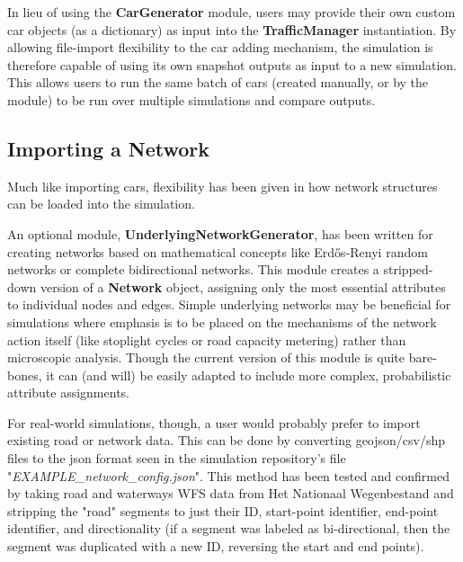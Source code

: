 \par In lieu of using the \textbf{CarGenerator} module, users may provide their own custom car objects (as a dictionary) as input into the \textbf{TrafficManager} instantiation.  By allowing file-import flexibility to the car adding mechanism, the simulation is therefore capable of using its own snapshot outputs as input to a new simulation.  This allows users to run the same batch of cars (created manually, or by the module) to be run over multiple simulations and compare outputs.



\subsection{Importing a Network}

\par Much like importing cars, flexibility has been given in how network structures can be loaded into the simulation.  \\

\par An optional module, \textbf{UnderlyingNetworkGenerator},  has been written for creating networks based on mathematical concepts like Erdős-Renyi random networks or complete bidirectional networks.  This module creates a stripped-down version of a \textbf{Network} object, assigning only the most essential attributes to individual nodes and edges.  Simple underlying networks may be beneficial for simulations where emphasis is to be placed on the mechanisms of the network action itself (like stoplight cycles or road capacity metering) rather than microscopic analysis.  Though the current version of this module is quite bare-bones, it can (and will) be easily adapted to include more complex, probabilistic attribute assignments. \\

\par For real-world simulations, though, a user would probably prefer to import existing road or network data.  This can be done by converting geojson/csv/shp files to the json format seen in the simulation repository's file "\textit{EXAMPLE\_network\_config.json}".  This method has been tested and confirmed by taking road and waterways WFS data from Het Nationaal Wegenbestand \cite{NWB22} and stripping the "road" segments to just their ID, start-point identifier, end-point identifier, and directionality (if a segment was labeled as bi-directional, then the segment was duplicated with a new ID, reversing the start and end points).


